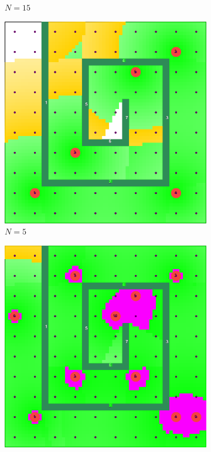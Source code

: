 \documentclass[conference]{IEEEtran}
\begin{document}
\begin{figure}[t]
\begin{subfigure}[t]{0.10\textwidth}
        \caption{$N=15$}
    \end{subfigure}
    \hspace{5mm}
    \begin{subfigure}[t]{0.10\textwidth}
        \centering
        \includegraphics[width=\textwidth]{Figures/Maze2_1.png}
        \caption{$N=5$}
    \end{subfigure}\hfill
    \begin{subfigure}[t]{0.10\textwidth}
        \centering
        \includegraphics[width=\textwidth]{Figures/Maze2_2.png}

\end{subfigure}
\end{figure}
\end{document}

